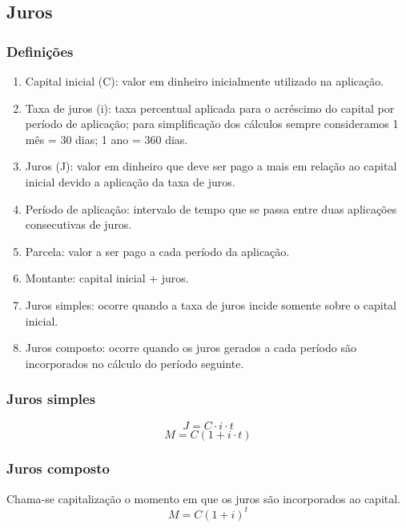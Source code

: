 \documentclass{article}
\begin{document}
\subsection{Juros}
\subsubsection{Definições}
\begin{enumerate}[\quad \quad $\bullet$]
    \item Capital inicial (C): valor em dinheiro inicialmente utilizado na aplicação.
    \item Taxa de juros (i): taxa percentual aplicada para o acréscimo do capital por período de aplicação; para simplificação dos cálculos sempre consideramos 1 mês = 30 dias; 1 ano = 360 dias.
    \item Juros (J): valor em dinheiro que deve ser pago a mais em relação ao capital inicial devido a aplicação da taxa de juros.
    \item Período de aplicação: intervalo de tempo que se passa entre duas aplicações consecutivas de juros.
    \item Parcela: valor a ser pago a cada período da aplicação.
    \item Montante: capital inicial + juros.
    \item Juros simples: ocorre quando a taxa de juros incide somente sobre o capital inicial.
    \item Juros composto: ocorre quando os juros gerados a cada período são incorporados no cálculo do período seguinte.
\end{enumerate}
\subsubsection{Juros simples}
\begin{equation*}
    J=C\cdot i\cdot t
\end{equation*}
\begin{equation*}
    M=C(1+i\cdot t)
\end{equation*}

\subsubsection{Juros composto}
Chama-se capitalização o momento em que os juros são incorporados ao capital.
\begin{equation*}
    M=C(1+i)^t
\end{equation*}
\end{document}
